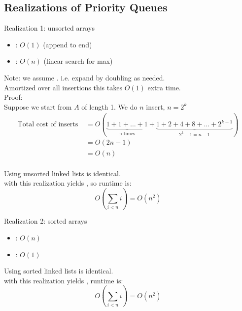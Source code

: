 \documentclass[letterpaper, 12pt]{article}
\newcommand{\red}[1]{{\color{red}{#1}}}
\begin{document}
    \subsection{Realizations of Priority Queues}
    Realization 1: unsorted arrays\\
    \begin{itemize}
        \item \red{insert}: $O(1)$ (append to end)
        \item \red{deleteMax}: $O(n)$ (linear search for max)
    \end{itemize}
    Note: we assume \red{dynamic arryas}. i.e. expand by doubling as needed.\\
    Amortized over all insertions this takes $O(1)$ extra time.\\
    Proof:\\
    Suppose we start from $A$ of length 1. We do $n$ insert, $n = 2^k$\\
    \begin{align*}
        \text{Total cost of inserts } &= O(\underbrace{1+1+ \dots +1}_{\text{n times}} + \underbrace{1 + 2 + 4 + 8 + \dots + 2^{k-1}}_{2^k-1 = n-1})\\
        &= O(2n-1)\\
        &= O(n)\\
    \end{align*}

    Using unsorted linked lists is identical.\\
    \red{PQ-sort} with this realization yields \red{selection sort}, so runtime is:
    $$O(\sum_{i<n}i) = O(n^2)$$
    \bigskip
    
    Realization 2: sorted arrays\\
    \begin{itemize}
        \item \red{insert}: $O(n)$
        \item \red{deleteMax}: $O(1)$
    \end{itemize}

    Using sorted linked lists is identical.\\
    \red{PQ-sort} with this realization yields \red{insertion sort}, runtime is:
    $$O(\sum_{i < n}i) = O(n^2)$$
    \pagebreak
\end{document}
